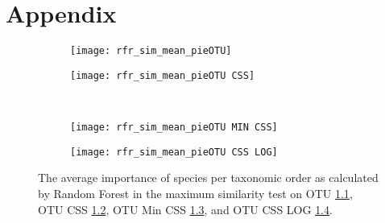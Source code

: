 \chapter{Appendix} 

\begin{figure}[h]
	\centering
	\begin{subfigure}{0.45\textwidth}
		\texttt{[image: rfr\_sim\_mean\_pieOTU]}
		\caption{}
		\label{fig:simotu}
	\end{subfigure}
	\begin{subfigure}{0.45\textwidth}
		\texttt{[image: rfr\_sim\_mean\_pieOTU CSS]}
		\caption{}
		\label{fig:simotucss}
	\end{subfigure}\\	
	\begin{subfigure}{0.45\textwidth}
		\texttt{[image: rfr\_sim\_mean\_pieOTU MIN CSS]}
		\caption{}
		\label{fig:simotumincss}
	\end{subfigure}
	\begin{subfigure}{0.45\textwidth}
		\texttt{[image: rfr\_sim\_mean\_pieOTU CSS LOG]}
		\caption{}
		\label{fig:simotucsslog}
	\end{subfigure}
	\caption{The average importance of species per taxonomic order as calculated by Random Forest in the maximum similarity test on OTU \ref{fig:simotu}, OTU CSS \ref{fig:simotucss}, OTU Min CSS \ref{fig:simotumincss}, and OTU CSS LOG \ref{fig:simotucsslog}.  }
	\label{fig:simpie}
\end{figure}

